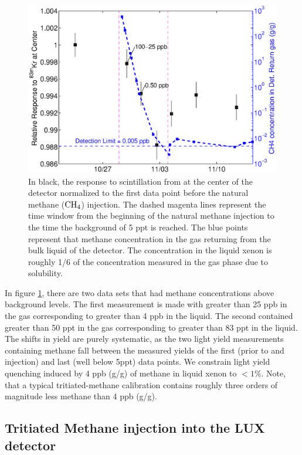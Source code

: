 \renewcommand{\baselinestretch}{1}
\small\normalsize
\begin{figure}[h!]\centering
\includegraphics[width=120mm]{Chapter_T/Figures/CH4/CH4_Kr.eps}
\caption{In black, the response to scintillation from \KrCal at the center of the detector normalized to the first data point before the natural methane ($\rm CH_4$) injection. The dashed magenta lines represent the time window from the beginning of the natural methane injection to the time the background of 5 ppt is reached. The blue points represent that methane concentration in the gas returning from the bulk liquid of the detector. The concentration in the liquid xenon is roughly 1/6 of the concentration measured in the gas phase due to solubility.  }
\label{fig:Methane_LY}
\end{figure}
\renewcommand{\baselinestretch}{2}
\small\normalsize

In figure \ref{fig:Methane_LY}, there are two \KrCal data sets that had methane concentrations above background levels. The first measurement is made with greater than 25 ppb in the gas corresponding to greater than 4 ppb in the liquid. The second contained greater than 50 ppt in the gas corresponding to greater than 83 ppt in the liquid. The shifts in yield are purely systematic, as the two light yield measurements containing methane fall between the measured yields of the first (prior to and injection) and last (well below 5ppt) data points. We constrain light yield quenching induced by 4 ppb (g/g) of methane in liquid xenon to $<1\%$. Note, that a typical tritiated-methane calibration contains roughly three orders of magnitude less methane than 4 ppb (g/g).


\subsection{Tritiated Methane injection into the LUX detector}

